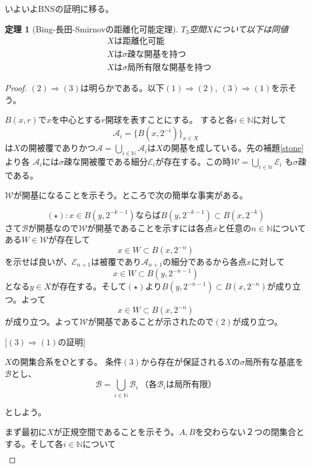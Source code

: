 \documentclass[leqno]{jsarticle}
\newtheorem{thm}{定理}
\newcommand{\To}{\Longrightarrow}
\newcommand{\nn}{\mathbb{N}}
\newcommand{\dpst}{\displaystyle}
\begin{document}
いよいよBNSの証明に移る。
\setcounter{equation}{0}
\begin{thm}[Bing-長田-Smirnovの距離化可能定理]
$T_3$空間$X$について以下は同値
\begin{align}
&\mbox{$X$は距離化可能}\\
&\mbox{$X$は$\sigma$疎な開基を持つ}\\
&\mbox{$X$は$\sigma$局所有限な開基を持つ}
\end{align}
\end{thm}
\begin{proof}
$(2)\To(3)$は明らかである。以下$(1)\To(2),\ (3)\To (1)$を示そう。\par
[$(1)\To (2)$の証明]\par
$B(x,r)$で$x$を中心とする$r$開球を表すことにする。
すると各$i\in \nn$に対して
\[
\mathcal{A}_i=\{B(x,2^{-i})\}_{x\in X}
\]
は$X$の開被覆でありかつ$\dpst \mathcal{A}=\bigcup_{i\in \nn}\mathcal{A}_i$は$X$の開基を成している。先の補題\ref{stone}より各
$\mathcal{A}_i$には$\sigma$疎な開被覆である細分$\mathcal{E}_i$が存在する。この時$\dpst \mathcal{W}=\bigcup_{i\in \nn }\mathcal{E}_i$
も$\sigma$疎である。\par 
$\mathcal{W}$が開基になることを示そう。ところで次の簡単な事実がある。\par
\[
(\star):\mbox{$x\in B(y,2^{-k-1})$ならば$B(y,2^{-k-1})\subset B(x,2^{-k})$}
\]
さて$\mathcal{B}$が開基なので$\mathcal{W}$が開基であることを示すには各点$x$と任意の$n\in \nn$についてある$W\in \mathcal{W}$が存在して
\[
x\in W\subset B(x,2^{-n})
\]
を示せば良いが、$\mathcal{E}_{n+1}$は被覆であり$\mathcal{A}_{n+1}$の細分であるから各点$x$に対して
\[
x\in W\subset B(y,2^{-n-1})
\]
となる$y\in X$が存在する。そして$(\star)$より$B(y,2^{-n-1})\subset B(x,2^{-n})$が成り立つ。よって
\[
x\in W\subset B(x,2^{-n})
\]
が成り立つ。よって$\mathcal{W}$が開基であることが示されたので$(2)$が成り立つ。
\par
[$(1)\To (2)$の証明終わり]\par
\setcounter{equation}{0}
[$(3)\To (1)$の証明]\par
$X$の開集合系を$\mathfrak{O}$とする。
条件$(3)$から存在が保証される$X$の$\sigma$局所有な基底を$\mathcal{B}$とし、
\[
\mathcal{B}=\bigcup_{i\in \nn }\mathcal{B}_i\ \mbox{（各$\mathcal{B}_i$は局所有限）}
\]\par
としよう。\par
まず最初に$X$が正規空間であることを示そう。$A,B$を交わらない２つの閉集合とする。そして各$i\in \nn$について
\begin{align*}

\end{align*}
\end{proof}
\end{document}
